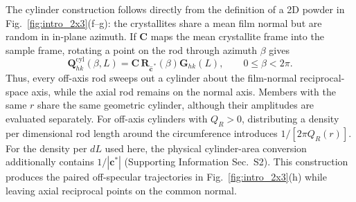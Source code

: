 The cylinder construction follows directly from the definition of a 2D powder in Fig.~\ref{fig:intro_2x3}(f--g): the crystallites share a mean film normal but are random in in-plane azimuth. If $\mathbf C$ maps the mean crystallite frame into the sample frame, rotating a point on the rod through azimuth $\beta$ gives
\begin{equation}
  \mathbf Q^{\mathrm{cyl}}_{hk}(\beta,L)
  =\mathbf C\,\mathbf R_{\widehat{\mathbf c}^{\,*}}(\beta)\mathbf G_{hk}(L),
  \qquad 0\leq\beta<2\pi.
  \label{eq:powder_cylinder}
\end{equation}
Thus, every off-axis rod sweeps out a cylinder about the film-normal reciprocal-space axis, while the axial rod remains on the normal axis. Members with the same $r$ share the same geometric cylinder, although their amplitudes are evaluated separately. For off-axis cylinders with $Q_R>0$, distributing a density per dimensional rod length around the circumference introduces $1/[2\pi Q_R(r)]$. For the density per $dL$ used here, the physical cylinder-area conversion additionally contains $1/|\mathbf c^*|$ (Supporting Information Sec.~S2). This construction produces the paired off-specular trajectories in Fig.~\ref{fig:intro_2x3}(h) while leaving axial reciprocal points on the common normal.
